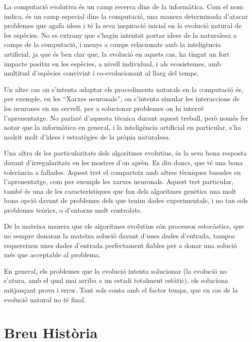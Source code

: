 %

La computació evolutiva és un camp recerca dins de la informàtica.  Com el nom
indica, és un camp especial dins la computació, una manera determinada d'atacar
problemes que agafa idees i té la seva inspiració inicial en la evolució natural
de les espècies.  No es extrany que s'hagin intentat portar idees de la
naturalesa a camps de la computació, i menys a camps relacionats amb la
inteligència artificial, ja que és ben clar que, la evolució en aquets cas, ha
tingut un fort impacte positiu en les espècies, a nivell individual, i als
ecosistemes, amb multitud d'espècies convivint i co-evolucionant al llarg del
temps.

Un altre cas on s'intenta adaptar els procediments naturals en la computació és,
per exemple, en les ``Xarxes neuronals'', on s'intenta simular les interaccions
de les neurones en un cervell, per a solucionar problemes on hi intervé
l'aprenentatge.  No parlaré d'aquesta tècnica durant aquest treball, però només
fer notar que la informàtica en general, i la inteligència artificial en
particular, s'ha nodrit molt d'idees i estratègies de la pròpia naturalesa.

Una altra de les particularitats dels algoritmes evolutius, és la seva bona
resposta davant d'irregularitats en les mostres d'on aprèn.  Es diu doncs, que
té una bona tolerància a fallades.  Aquest tret el comparteix amb altres
tècniques basades en l'aprenentatge, com per exemple les xarxes neuronals.
Aquest tret particular, també és una de les característiques que fan dels
algoritmes genètics una molt bona opció davant de problemes dels que tenim dades
experimentals, i no tan sols problemes teòrics, o d'entorns molt controlats.

De la mateixa manera que els algoritmes evolutius són processos estocàstics, que
no sempre donaran la mateixa solució davant d'unes dades d'entrada, tampoc
requereixen unes dades d'entrada perfectament fiables per a donar una solució
més que acceptable al problema.

En general, els problemes que la evolució intenta solucionar (la evolució no
s'atura, amb el qual mai arriba a un estadi totalment estàtic), els soluciona
mitjançant prova i error.  Tant sols conta amb el factor temps, que en cas de la
evolució natural no té final.


\section{Breu Història} %
\label{sec:Breu Historia}

